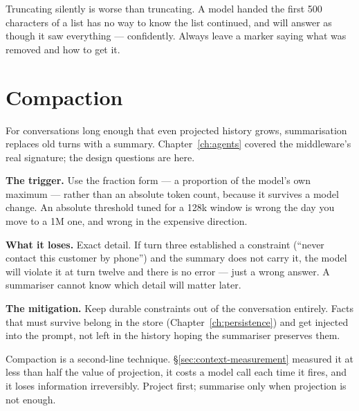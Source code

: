 \begin{warning}
Truncating silently is worse than truncating. A model handed the first 500
characters of a list has no way to know the list continued, and will answer as
though it saw everything --- confidently. Always leave a marker saying what was
removed and how to get it.
\end{warning}

\section{Compaction}
\label{sec:compaction}

For conversations long enough that even projected history grows, summarisation
replaces old turns with a summary. Chapter~\ref{ch:agents} covered the
middleware's real signature; the design questions are here.


\textbf{The trigger.} Use the fraction form --- a proportion of the model's own
maximum --- rather than an absolute token count, because it survives a model
change. An absolute threshold tuned for a 128k window is wrong the day you move
to a 1M one, and wrong in the expensive direction.

\textbf{What it loses.} Exact detail. If turn three established a constraint
(``never contact this customer by phone'') and the summary does not carry it, the
model will violate it at turn twelve and there is no error --- just a wrong
answer. A summariser cannot know which detail will matter later.

\textbf{The mitigation.} Keep durable constraints out of the conversation
entirely. Facts that must survive belong in the store
(Chapter~\ref{ch:persistence}) and get injected into the prompt, not left in the
history hoping the summariser preserves them.

\begin{note}
Compaction is a second-line technique. \S\ref{sec:context-measurement} measured
it at less than half the value of projection, it costs a model call each time it
fires, and it loses information irreversibly. Project first; summarise only when
projection is not enough.
\end{note}

